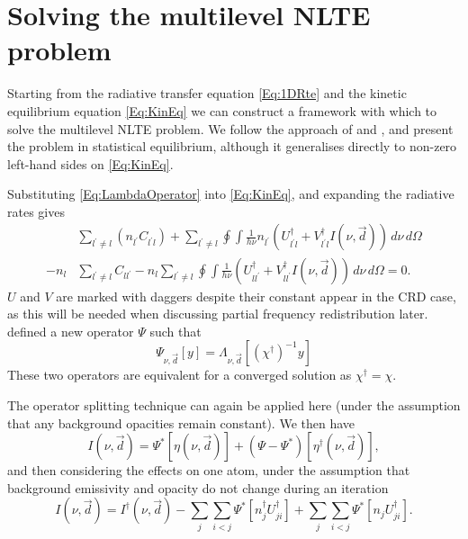 \section{Solving the multilevel NLTE problem}

Starting from the radiative transfer equation \eqref{Eq:1DRte} and the kinetic equilibrium equation \eqref{Eq:KinEq} we can construct a framework with which to solve the multilevel NLTE problem. We follow the approach of \citet{Rybicki1992} and \citet{Uitenbroek2001}, and present the problem in statistical equilibrium, although it generalises directly to non-zero left-hand sides on \eqref{Eq:KinEq}.

Substituting \eqref{Eq:LambdaOperator} into \eqref{Eq:KinEq}, and expanding the radiative rates gives
\begin{equation}
\begin{aligned}
   &\sum_{l^\prime\neq l} (n_{l^\prime}C_{l^\prime l}) +
   \sum_{l^\prime\neq l} \oint \int \frac{1}{h\nu} n_{l^\prime} (U^\dagger_{l^\prime l} + V^\dagger_{l^\prime l} I(\nu, \vec{d}))\, d\nu\, d\Omega\\
   -
   n_l &\sum_{l^\prime\neq l} C_{l l^\prime} -
   n_l \sum_{l^\prime\neq l} \oint \int \frac{1}{h\nu} (U^\dagger_{l l^\prime} + V^\dagger_{l l^\prime} I(\nu, \vec{d}))\, d\nu\, d\Omega
   = 0.
   \label{Eq:StatEqExpanded}
\end{aligned}
\end{equation}
$U$ and $V$ are marked with daggers despite their constant appear in the CRD case, as this will be needed when discussing partial frequency redistribution later.
\citet{Rybicki1992} defined a new operator $\Psi$ such that
\begin{equation}
    \Psi_{\nu, \vec{d}}[y] = \Lambda_{\nu, \vec{d}}[(\chi^\dagger)^{-1}y]
\end{equation}
These two operators are equivalent for a converged solution as $\chi^\dagger = \chi$.

The operator splitting technique can again be applied here (under the assumption that any background opacities remain constant). We then have
\begin{equation}
    I(\nu, \vec{d}) = \Psi^*[\eta(\nu, \vec{d})] + (\Psi - \Psi^*)[\eta^\dagger(\nu, \vec{d})],
\end{equation}
and then considering the effects on one atom, under the assumption that background emissivity and opacity do not change during an iteration
\begin{equation}
    I(\nu, \vec{d}) = I^\dagger(\nu, \vec{d})
                    - \sum_j\sum_{i<j}\Psi^*[n^\dagger_j U^\dagger_{ji}]
                    + \sum_j\sum_{i<j}\Psi^*[n_j U^\dagger_{ji}].
\end{equation}

